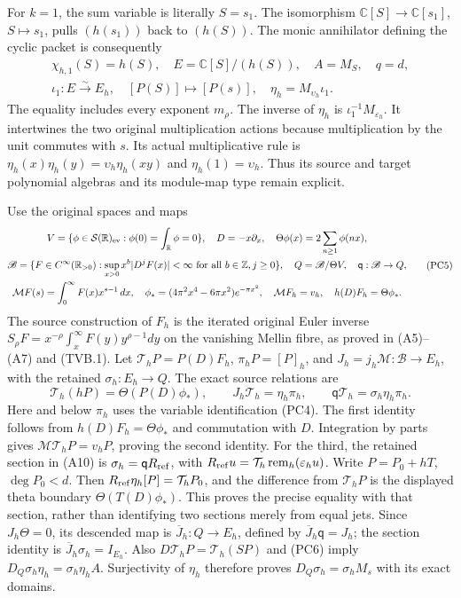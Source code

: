 \documentclass{article}
\begin{document}
For $k=1$, the sum variable is literally $S=s_1$.  The isomorphism
$\mathbb C[S]\to\mathbb C[s_1]$, $S\mapsto s_1$, pulls
$(h(s_1))$ back to $(h(S))$.  The monic annihilator defining the
cyclic packet is consequently
\[
 \begin{gathered}
 \chi_{h,1}(S)=h(S),\quad E=\mathbb C[S]/(h(S)),\quad
 A=M_S,\quad q=d,\\
 \iota_1:E\xrightarrow{\sim}E_h,\quad[P(S)]\mapsto[P(s)],
 \quad\eta_h=M_{\upsilon_h}\iota_1.
 \end{gathered}
 \tag{PC4}
\]
The equality includes every exponent $m_\rho$.  The inverse of
$\eta_h$ is $\iota_1^{-1}M_{\varepsilon_h}$.  It intertwines the
two original multiplication actions because multiplication by the unit
commutes with $s$.  Its actual multiplicative rule is
$\eta_h(x)\eta_h(y)=\upsilon_h\eta_h(xy)$ and
$\eta_h(1)=\upsilon_h$.  Thus its source and target polynomial
algebras and its module-map type remain explicit.

Use the original spaces and maps
\[
\begin{gathered}
 V=\{\phi\in\mathcal S(\mathbb R)_{\rm ev}:
             \phi(0)=\int_{\mathbb R}\phi=0\},\quad
 D=-x\partial_x,\quad\Theta\phi(x)=2\sum_{n\ge1}\phi(nx),\\
 \mathscr B=\{F\in C^\infty(\mathbb R_{>0}):\sup_{x>0}x^b|D^jF(x)|<\infty
                  \text{ for all }b\in\mathbb Z,j\ge0\},\quad
 Q=\mathscr B/\Theta V,\quad\mathsf q:\mathscr B\to Q,\\
 \mathcal MF(s)=\int_0^\infty F(x)x^{s-1}\,dx,\quad
 \phi_*=(4\pi^2x^4-6\pi x^2)e^{-\pi x^2},\quad
 \mathcal M F_h=v_h,\quad h(D)F_h=\Theta\phi_*.
\end{gathered}\tag{PC5}
\]
The source construction of $F_h$ is the iterated original Euler inverse
$S_\rho F=x^{-\rho}\int_x^\infty F(y)y^{\rho-1}dy$ on the
vanishing Mellin fibre, as proved in (A5)--(A7) and (TVB.1).
Let $\mathcal T_hP=P(D)F_h$, $\pi_hP=[P]_h$, and
$J_h=j_h\mathcal M:\mathscr B\to E_h$, with the retained
$\sigma_h:E_h\to Q$.  The exact source relations are
\[
 \mathcal T_h(hP)=\Theta(P(D)\phi_*),\qquad
 J_h\mathcal T_h=\eta_h\pi_h,\qquad
 \mathsf q\mathcal T_h=\sigma_h\eta_h\pi_h.
 \tag{PC6}
\]
Here and below $\pi_h$ uses the variable identification (PC4).
The first identity follows from $h(D)F_h=\Theta\phi_*$ and
commutation with $D$.  Integration by parts gives
$\mathcal M\mathcal T_hP=v_hP$, proving the second identity.
For the third, the retained section in (A10) is
$\sigma_h=\mathsf q R_{\rm ref}$, with
$R_{\rm ref}u=\mathcal T_h\operatorname{rem}_h(\varepsilon_hu)$.
Write $P=P_0+hT$, $\deg P_0<d$.  Then
$R_{\rm ref}\eta_h[P]=\mathcal T_hP_0$, and the difference from
$\mathcal T_hP$ is the displayed theta boundary
$\Theta(T(D)\phi_*)$.  This proves the precise equality with that
section, rather than identifying two sections merely from equal jets.
Since $J_h\Theta=0$, its descended map is
$\overline J_h:Q\to E_h$, defined by
$\overline J_h\mathsf q=J_h$; the section identity is
$\overline J_h\sigma_h=I_{E_h}$.
Also $D\mathcal T_hP=\mathcal T_h(SP)$ and (PC6) imply
$D_Q\sigma_h\eta_h=\sigma_h\eta_hA$.
Surjectivity of $\eta_h$ therefore proves
$D_Q\sigma_h=\sigma_hM_s$ with its exact domains.
\end{document}

